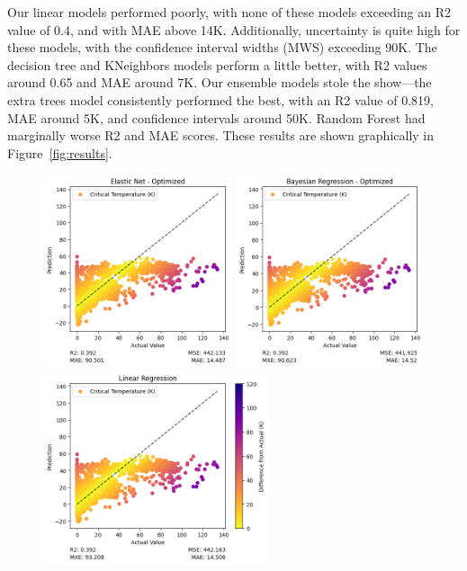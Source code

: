 \documentclass[twocolumn, nofootinbib, secnumarabic, amssymb, nobibnotes, aps, prd]{revtex4-2}
\begin{document}
Our linear models performed poorly, with none of these models exceeding an R2 value of 0.4, and with MAE above 14K. Additionally, uncertainty is quite high for these models, with the confidence interval widths (MWS) exceeding 90K. The decision tree and KNeighbors models perform a little better, with R2 values around 0.65 and MAE around 7K. Our ensemble models stole the show—the extra trees model consistently performed the best, with an R2 value of 0.819, MAE around 5K, and confidence intervals around 50K. Random Forest had marginally worse R2 and MAE scores. These results are shown graphically in Figure~\ref{fig:results}.

\onecolumngrid
\vspace*{\fill}
 \begin{figure}[!htb] %
    \centering
    \includegraphics[height=2.23in]{images/subfigures/no_uncertainty/elastic_net_optimized.png}
    \includegraphics[height=2.23in]{images/subfigures/no_uncertainty/bayesian_regression_optimized.png}
    \includegraphics[height=2.23in]{images/subfigures/no_uncertainty/linear_regression.png}

\end{figure}
\end{document}
